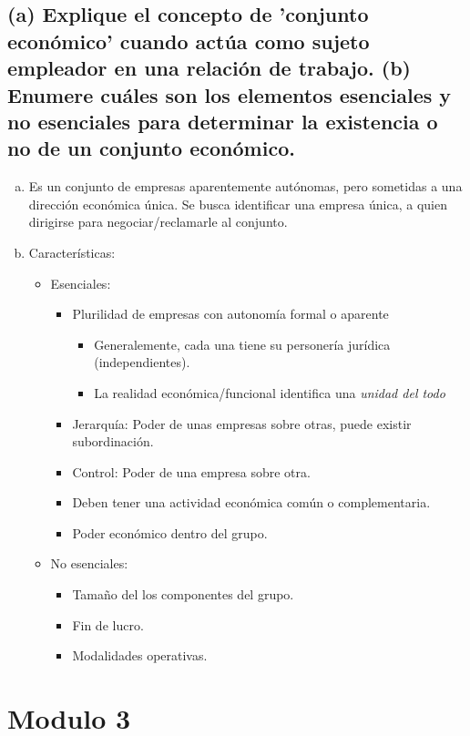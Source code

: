 \documentclass[spanish,12pt,a4paper,titlepage]{report}
\begin{document}
\subsection{(a) Explique el concepto de 'conjunto económico' cuando actúa como sujeto empleador en una relación de trabajo. (b) Enumere cuáles son los elementos esenciales y no esenciales para determinar la existencia o no de un conjunto económico.}

\begin{enumerate}[(a)]
\item Es un conjunto de empresas aparentemente autónomas, pero sometidas a una dirección económica única. Se busca identificar una empresa única, a quien dirigirse para negociar/reclamarle al conjunto.
\item Características:
  \begin{itemize}
  \item Esenciales:
    \begin{itemize}
    \item Plurilidad de empresas con autonomía formal o aparente
      \begin{itemize}
      \item Generalemente, cada una tiene su personería jurídica (independientes).
      \item La realidad económica/funcional identifica una \textit{unidad del todo}
      \end{itemize}
    \item Jerarquía: Poder de unas empresas sobre otras, puede existir subordinación.
    \item Control: Poder de una empresa sobre otra.
    \item Deben tener una actividad económica común o complementaria.
    \item Poder económico dentro del grupo.
    \end{itemize}
  \item No esenciales:
    \begin{itemize}
    \item Tamaño del los componentes del grupo.
    \item Fin de lucro.
    \item Modalidades operativas.
    \end{itemize}
  \end{itemize}
\end{enumerate}

\section{Modulo 3}
\end{document}
